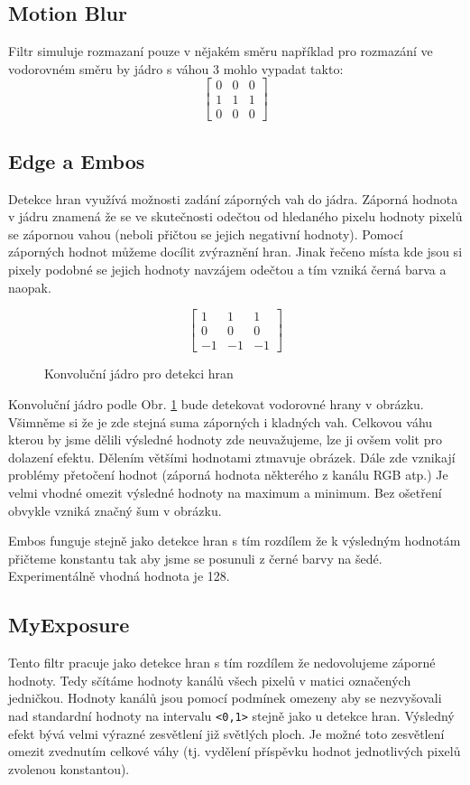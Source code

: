 \documentclass[12pt]{article}
\begin{document}
\subsection{Motion Blur}
Filtr simuluje rozmazaní pouze v nějakém směru například pro rozmazání ve vodorovném směru by jádro s váhou 3 mohlo vypadat takto:
\[
  \begin{bmatrix}
    0 & 0 & 0\\
    1 & 1 & 1\\
    0 & 0 & 0
  \end{bmatrix}
\]

\subsection{Edge a Embos}
Detekce hran využívá možnosti zadání záporných vah do jádra. Záporná hodnota v jádru znamená že se ve skutečnosti odečtou od hledaného pixelu hodnoty pixelů se zápornou vahou (neboli přičtou se jejich negativní hodnoty). Pomocí záporných hodnot můžeme docílit zvýraznění hran. Jinak řečeno místa kde jsou si pixely podobné se jejich hodnoty navzájem odečtou a tím vzniká černá barva a naopak.

\begin{figure}
\[
  \begin{bmatrix}
    1 & 1 & 1\\
    0 & 0 & 0\\
   -1 &-1 &-1
  \end{bmatrix}
\]
\caption{Konvoluční jádro pro detekci hran}
\label{konvolucni_jadro_edge}
\end{figure}

Konvoluční jádro podle Obr. \ref{konvolucni_jadro_edge} bude detekovat vodorovné hrany v obrázku. Všimněme si že je zde stejná suma záporných i kladných vah. Celkovou váhu kterou by jsme dělili výsledné hodnoty zde neuvažujeme, lze ji ovšem volit pro dolazení efektu. Dělením většími hodnotami ztmavuje obrázek. Dále zde vznikají problémy přetočení hodnot (záporná hodnota některého z kanálu RGB atp.) Je velmi vhodné omezit výsledné hodnoty na maximum a minimum. Bez ošetření obvykle vzniká značný šum v obrázku.

Embos funguje stejně jako detekce hran s tím rozdílem že k výsledným hodnotám přičteme konstantu tak aby jsme se posunuli z černé barvy na šedé. Experimentálně vhodná hodnota je 128.

\pagebreak
\subsection{MyExposure}
Tento filtr pracuje jako detekce hran s tím rozdílem že nedovolujeme záporné hodnoty. Tedy sčítáme hodnoty kanálů všech pixelů v matici označených jedničkou. Hodnoty kanálů jsou pomocí podmínek omezeny aby se nezvyšovali nad standardní hodnoty na intervalu \texttt{<0,1>} stejně jako u detekce hran. Výsledný efekt bývá velmi výrazné zesvětlení již světlých ploch. Je možné toto zesvětlení omezit zvednutím celkové váhy (tj. vydělení příspěvku hodnot jednotlivých pixelů zvolenou konstantou).
\end{document}
